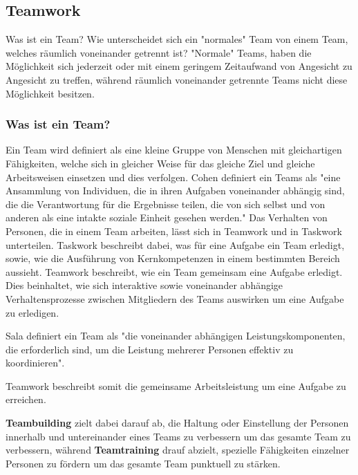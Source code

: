 \documentclass[a4paper,11pt]{article}%
\renewcommand{\\}{\vspace*{0.5\baselineskip} \newline}
\begin{document}
\newpage
	\subsection{Teamwork}		
	\label{Teamwork}
Was ist ein Team? Wie unterscheidet sich ein "normales" Team von einem Team, welches räumlich voneinander getrennt ist? "Normale" Teams, haben die Möglichkeit sich jederzeit oder mit einem geringem Zeitaufwand von Angesicht zu Angesicht zu treffen, während räumlich voneinander getrennte Teams nicht diese Möglichkeit besitzen.

		\subsubsection{Was ist ein Team?}
	Ein Team wird definiert als eine kleine Gruppe von Menschen mit gleichartigen Fähigkeiten, welche sich in gleicher Weise für das gleiche Ziel und gleiche Arbeitsweisen einsetzen und dies verfolgen.\citep[p.2]{zenun2007effects} \newline
Cohen \citep[p.557]{cohen1997makes} definiert ein Teams als "eine Ansammlung von Individuen, die in ihren Aufgaben voneinander abhängig sind, die die Verantwortung für die Ergebnisse teilen, die von sich selbst und von anderen als eine intakte soziale Einheit gesehen werden."
Das Verhalten von Personen, die in einem Team arbeiten, lässt sich in \glqq Teamwork \grqq und in \glqq Taskwork \grqq unterteilen. \citep[p. 541-542]{rousseau2006teamwork}
Taskwork beschreibt dabei, was für eine Aufgabe ein Team erledigt, sowie, wie die Ausführung von Kernkompetenzen in einem bestimmten Bereich aussieht. 
Teamwork beschreibt, wie ein Team gemeinsam eine Aufgabe erledigt. Dies beinhaltet, wie sich interaktive sowie voneinander abhängige Verhaltensprozesse zwischen Mitgliedern des Teams auswirken um eine Aufgabe zu erledigen. \citep[p. 357]{marks2001temporally} 

Sala \citep[p.541]{salas2008teams} definiert ein Team als "die voneinander abhängigen Leistungskomponenten, die erforderlich sind, um die Leistung mehrerer Personen effektiv zu koordinieren".

Teamwork beschreibt somit die gemeinsame Arbeitsleistung um eine Aufgabe zu erreichen.

\textbf{Teambuilding} zielt dabei darauf ab, die Haltung oder Einstellung der Personen innerhalb und untereinander eines Teams zu verbessern um das gesamte Team zu verbessern, während \textbf{Teamtraining} drauf abzielt, spezielle Fähigkeiten einzelner Personen zu fördern um das gesamte Team punktuell zu stärken. \citep[p. 367-369]{shuffler2011there}\
		
\end{document}
